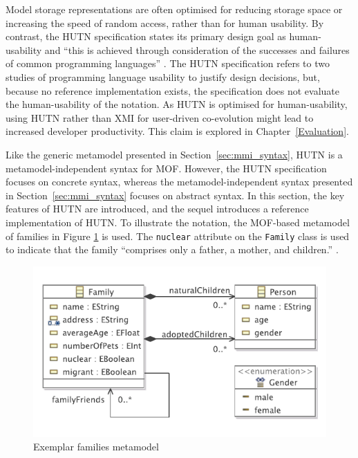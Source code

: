 Model storage representations are often optimised for reducing storage space or increasing the speed of random access, rather than for human usability. By contrast, the HUTN specification states its primary design goal as human-usability and ``this is achieved through consideration of the successes and failures of common programming languages'' \cite[Section 2.2]{hutn}. The HUTN specification refers to two studies of programming language usability to justify design decisions, but, because no reference implementation exists, the specification does not evaluate the human-usability of the notation. As HUTN is optimised for human-usability, using HUTN rather than XMI for user-driven co-evolution might lead to increased developer productivity. This claim is explored in Chapter~\ref{Evaluation}.

Like the generic metamodel presented in Section~\ref{sec:mmi_syntax}, HUTN is a metamodel-independent syntax for 
MOF. However, the HUTN specification focuses on concrete syntax, whereas the metamodel-independent syntax presented in Section~\ref{sec:mmi_syntax} focuses on abstract syntax. In this section, the key features of HUTN are introduced, and the sequel introduces a reference implementation of HUTN. To illustrate the notation, the MOF-based metamodel of families in Figure \ref{fig:example-mm} is used. The \texttt{nu\-cl\-e\-ar} attribute on the \texttt{Fa\-mi\-ly} class is used to indicate that the family ``comprises only a father, a mother, and children.'' \cite{nucleardef}.

\begin{figure}[htbp]
  \begin{center}
    \leavevmode
    \includegraphics[scale=0.85]{5.Implementation/images/families.pdf}
  \end{center}
  \caption{Exemplar families metamodel}
  \label{fig:example-mm}
\end{figure}


